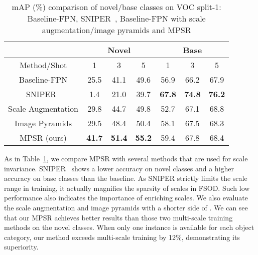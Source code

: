 \documentclass[runningheads]{llncs}
\begin{document}
\setlength{\tabcolsep}{5pt}
\begin{table}
	\begin{center}
		\caption{mAP (\%) comparison of novel/base classes on VOC split-1: Baseline-FPN, SNIPER~\cite{sniper},  Baseline-FPN with scale augmentation/image pyramids and MPSR}
		\label{table:iptable}
		\begin{tabular}{c|ccc|ccc}
			\hline
			\multicolumn{1}{c|}{} & \multicolumn{3}{c|}{Novel}                    & \multicolumn{3}{c}{Base}                      \\ \hline
			Method/Shot           & 1             & 3             & 5             & 1             & 3             & 5             \\ \hline
			Baseline-FPN          & 25.5          & 41.1          & 49.6          & 56.9          & 66.2          & 67.9          \\
			SNIPER~\cite{sniper} & 1.4          & 21.0          & 39.7          & \textbf{67.8}          & \textbf{74.8}          & \textbf{76.2}          \\
			Scale Augmentation        & 29.8          & 44.7          & 49.8          & 52.7          & 67.1          & 68.8          \\
			Image Pyramids        & 29.5          & 48.4          & 50.4          & 58.1          & 67.5          & 68.3          \\
			MPSR (ours)           & \textbf{41.7} & \textbf{51.4} & \textbf{55.2} & 59.4 & 67.8 & 68.4 \\ \hline
		\end{tabular}
	\end{center}
\end{table}
\setlength{\tabcolsep}{1.4pt}

As in Table~\ref{table:iptable}, we compare MPSR with several methods that are used for scale invariance.
SNIPER~\cite{sniper} shows a lower accuracy on novel classes and a higher accuracy on base classes than the baseline. 
As SNIPER strictly limits the scale range in training, it actually magnifies the sparsity of scales in FSOD. 
Such low performance also indicates the importance of enriching scales.  
We also evaluate the scale augmentation and image pyramids with a shorter side of  \cite{sppnet}.
We can see that our MPSR achieves better results than those two  multi-scale training methods on the novel classes. 
When only one instance is available for each object category, our method exceeds multi-scale training by 12\%, demonstrating its superiority.
\end{document}
